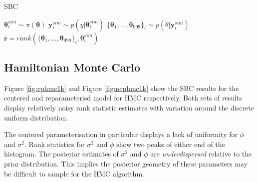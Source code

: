 \documentclass[12pt, a4paper]{article}
\begin{document}
    \begin{algorithm}
        \caption{SBC}\label{alg:sbc}
        \begin{algorithmic}
                \State {} $\boldsymbol{\theta}^{sim}_i \sim\pi (\boldsymbol{\theta})$
                \State {} $\boldsymbol{y}^{sim}_i \sim p(y|\boldsymbol{\theta}^{sim}_i)$
                \State {} $\{\boldsymbol{\theta}_1,\dots , \boldsymbol{\theta}_{999}\}_i \sim p(\theta | \boldsymbol{y}^{sim}_i)$
                \State {} $\boldsymbol{r} = rank(\{\boldsymbol{\theta}_1,\dots , \boldsymbol{\theta}_{999}\}_i, \boldsymbol{\theta}^{sim}_i)$
              \EndFor
        \end{algorithmic}
        \end{algorithm}
        
    \subsection{Hamiltonian Monte Carlo}
    Figure \ref{fig:cphmc1k} and Figure \ref{fig:ncphmc1k} show the SBC results for the centered and reparameterisd model for HMC respectively. Both sets of results display relatively noisy rank statistic estimates with variation around the discrete uniform distribution.

    The centered parameterisation in particular displays a lack of uniformity for $\phi$ and $\sigma^2$. Rank statistics for $\sigma^2$ and $\phi$ show two peaks of either end of the histogram. The posterior estimates of $\sigma^2$ and $\phi$ are \textit{underdispersed} relative to the prior distribution. This implies the posterior geometry of these parameters may be difficult to sample for the HMC algorithm.
\end{document}
